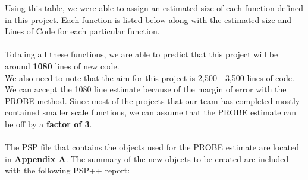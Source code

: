\documentclass[11pt, letterpaper]{report}
\begin{document}
\begin{description}
Using this table, we were able to assign an estimated size of each function defined in this project. Each function is listed below along with the estimated size and Lines of Code for each particular function. \\ \\
Totaling all these functions, we are able to predict that this project will be around \textbf{1080} lines of new code. \\ 
We also need to note that the aim for this project is 2,500 - 3,500 lines of code. We can accept the 1080 line estimate because of the margin of error with the PROBE method. Since most of the projects that our team has completed mostly contained smaller scale functions, we can assume that the PROBE estimate can be off by a \textbf{factor of 3}. \\ \\
The PSP file that contains the objects used for the PROBE estimate are located in \textbf{Appendix A}. The summary of the new objects to be created are included with the following PSP++ report:





\end{description}
\end{document}
